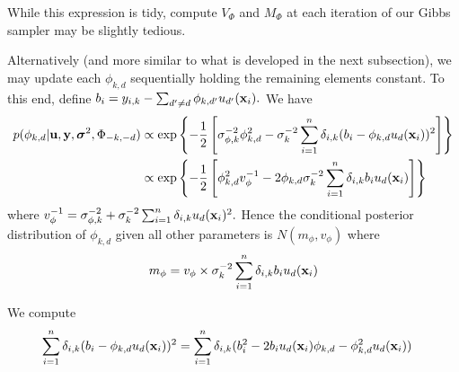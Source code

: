 \documentclass[12pt]{article}
\begin{document}
While this expression is tidy, compute $V_{\Phi}$ and $M_{\Phi}$ at each iteration of our Gibbs sampler may be slightly tedious.

Alternatively (and more similar to what is developed in the next subsection), we may update each $\phi_{k,d}$ sequentially holding the remaining elements constant.
To this end, define $b_{i} = y_{i,k} - \sum_{d' \neq d}{\phi_{k,d'}u_{d'}(\mathbf{x}_{i})}.$
We have
\begin{align*}
p(\phi_{k,d} | \mathbf{u}, \mathbf{y}, \boldsymbol{\sigma}^{2}, \Phi_{-k,-d}) &\propto \exp\left\{-\frac{1}{2}\left[\sigma_{\phi,k}^{-2}\phi_{k,d}^{2} - \sigma^{-2}_{k}\sum_{i = 1}^{n}{\delta_{i,k}(b_{i} - \phi_{k,d}u_{d}(\mathbf{x}_{i}))^{2}}\right]\right\}\\
&\propto \exp\left\{-\frac{1}{2}\left[ \phi_{k,d}^{2}v_{\phi}^{-1} - 2\phi_{k,d}\sigma^{-2}_{k}\sum_{i = 1}^{n}{\delta_{i,k}b_{i}u_{d}(\mathbf{x}_{i})}\right]\right\}
\end{align*}
where $v_{\phi}^{-1} = \sigma^{-2}_{\phi,k} + \sigma^{-2}_{k}\sum_{i = 1}^{n}{\delta_{i,k}u_{d}(\mathbf{x}_{i})^{2}}.$ 
Hence the conditional posterior distribution of $\phi_{k,d}$ given all other parameters is $N(m_{\phi},v_{\phi})$ where
$$
m_{\phi} = v_{\phi} \times \sigma^{-2}_{k}\sum_{i = 1}^{n}{\delta_{i,k}b_{i}u_{d}(\mathbf{x}_{i})}
$$

We compute
\begin{align*}
\sum_{i = 1}^{n}{\delta_{i,k}(b_{i} - \phi_{k,d}u_{d}(\mathbf{x}_{i}))^{2}} &= \sum_{i = 1}^{n}{\delta_{i,k}(b_{i}^{2} - 2b_{i}u_{d}(\mathbf{x}_{i})\phi_{k,d} - \phi_{k,d}^{2}u_{d}(\mathbf{x}_{i}))}
\end{align*}
\end{document}
